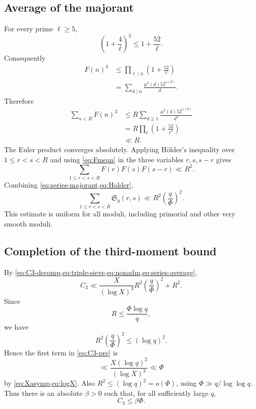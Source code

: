 \documentclass[11pt]{article}
\theoremstyle{definition}
\theoremstyle{remark}
\newcommand{\Ss}{\mathfrak S}
\newcommand{\1}{\mathbf 1}
\newcommand{\om}{\omega}
\begin{document}
\subsection{Average of the majorant}

For every prime $\ell\ge5$,
\[
 \left(1+\frac4\ell\right)^3\le1+\frac{52}{\ell}.
\]
Consequently
\begin{align}
 F(n)^3
 &\le\prod_{\ell\mid n}\left(1+\frac{52}{\ell}\right)\\
 &=\sum_{d\mid n}\frac{\mu^2(d)52^{\om(d)}}d.
\end{align}
Therefore
\begin{align}
 \sum_{n<R}F(n)^3
 &\le R\sum_{d\ge1}\frac{\mu^2(d)52^{\om(d)}}{d^2}\\
 &=R\prod_\ell\left(1+\frac{52}{\ell^2}\right)\\
 &\ll R.\label{eq:Fmean}
\end{align}
The Euler product converges absolutely.
Applying H\"older's inequality over $1\le r<s<R$ and using \cref{eq:Fmean} in the three variables $r,s,s-r$ gives
\begin{equation}\label{eq:Holder}
 \sum_{1\le r<s<R}F(r)F(s)F(s-r)\ll R^2.
\end{equation}
Combining \cref{eq:series-majorant,eq:Holder},
\begin{equation}\label{eq:series-average}
 \sum_{1\le r<s<R}\Ss_q(r,s)
 \ll R^2\left(\frac q\Phi\right)^2.
\end{equation}
This estimate is uniform for all moduli, including primorial and other very smooth moduli.

\subsection{Completion of the third-moment bound}

By \cref{eq:C3-decomp,eq:triple-sieve,eq:nonadm,eq:series-average},
\begin{equation}\label{eq:C3-pre}
 C_3\ll
 \frac{X}{(\log X)^3}R^2\left(\frac q\Phi\right)^2+R^2.
\end{equation}
Since
\[
 R\le\frac{\Phi\log q}{q},
\]
we have
\[
 R^2\left(\frac q\Phi\right)^2\le(\log q)^2.
\]
Hence the first term in \cref{eq:C3-pre} is
\[
 \ll\frac{X(\log q)^2}{(\log X)^3}\ll\Phi
\]
by \cref{eq:Xasymp,eq:logX}.  Also $R^2\le(\log q)^2=o(\Phi)$, using $\Phi\gg q/\log\log q$.  Thus there is an absolute $\beta>0$ such that, for all sufficiently large $q$,
\begin{equation}\label{eq:C3}
 \boxed{C_3\le\beta\Phi.}
\end{equation}
\end{document}
